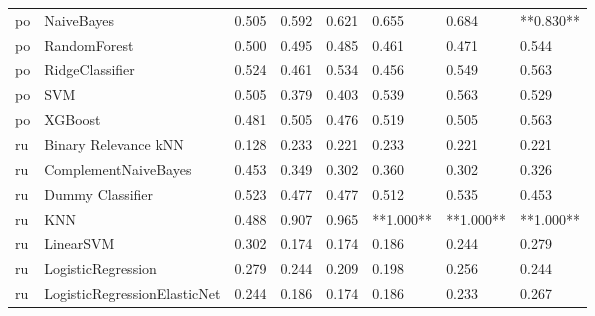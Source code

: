 \begin{tabular}{llllllll}
      po &                      NaiveBayes & 0.505 &                     0.592 &                 0.621 &                  0.655 &                                   0.684 & **0.830** \\
      po &                    RandomForest & 0.500 &                     0.495 &                 0.485 &                  0.461 &                                   0.471 &     0.544 \\
      po &                 RidgeClassifier & 0.524 &                     0.461 &                 0.534 &                  0.456 &                                   0.549 &     0.563 \\
      po &                             SVM & 0.505 &                     0.379 &                 0.403 &                  0.539 &                                   0.563 &     0.529 \\
      po &                         XGBoost & 0.481 &                     0.505 &                 0.476 &                  0.519 &                                   0.505 &     0.563 \\
      ru &            Binary Relevance kNN & 0.128 &                     0.233 &                 0.221 &                  0.233 &                                   0.221 &     0.221 \\
      ru &            ComplementNaiveBayes & 0.453 &                     0.349 &                 0.302 &                  0.360 &                                   0.302 &     0.326 \\
      ru &                Dummy Classifier & 0.523 &                     0.477 &                 0.477 &                  0.512 &                                   0.535 &     0.453 \\
      ru &                             KNN & 0.488 &                     0.907 &                 0.965 &              **1.000** &                               **1.000** & **1.000** \\
      ru &                       LinearSVM & 0.302 &                     0.174 &                 0.174 &                  0.186 &                                   0.244 &     0.279 \\
      ru &              LogisticRegression & 0.279 &                     0.244 &                 0.209 &                  0.198 &                                   0.256 &     0.244 \\
      ru &    LogisticRegressionElasticNet & 0.244 &                     0.186 &                 0.174 &                  0.186 &                                   0.233 &     0.267 \\

\end{tabular}
